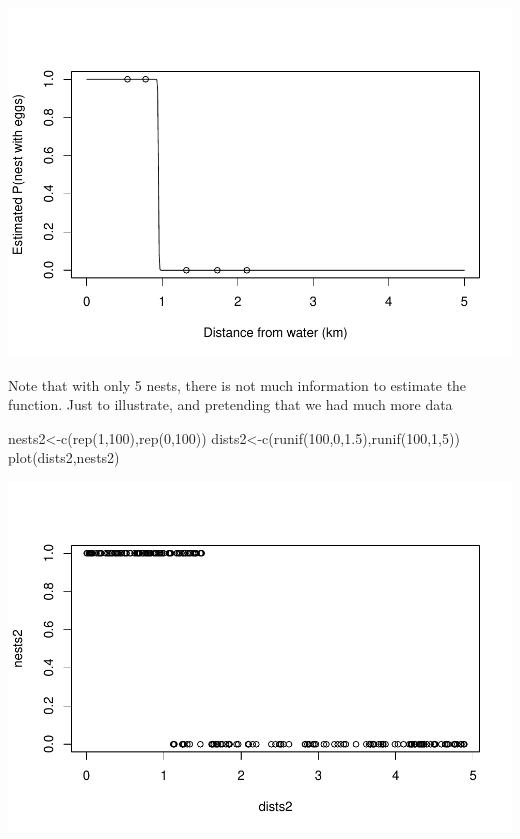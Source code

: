 \documentclass[
]{book}
\newenvironment{Shaded}{\begin{snugshade}}{\end{snugshade}}
\newcommand{\DecValTok}[1]{\textcolor[rgb]{0.00,0.00,0.81}{#1}}
\newcommand{\FloatTok}[1]{\textcolor[rgb]{0.00,0.00,0.81}{#1}}
\newcommand{\FunctionTok}[1]{\textcolor[rgb]{0.00,0.00,0.00}{#1}}
\newcommand{\NormalTok}[1]{#1}
\newcommand{\OtherTok}[1]{\textcolor[rgb]{0.56,0.35,0.01}{#1}}
\begin{document}
\includegraphics{ECOMODbook_files/figure-latex/ch13.36-1.pdf}

Note that with only 5 nests, there is not much information to estimate the function. Just to illustrate, and pretending that we had much more data

\begin{Shaded}
\begin{Highlighting}[]
\NormalTok{nests2}\OtherTok{\textless{}{-}}\FunctionTok{c}\NormalTok{(}\FunctionTok{rep}\NormalTok{(}\DecValTok{1}\NormalTok{,}\DecValTok{100}\NormalTok{),}\FunctionTok{rep}\NormalTok{(}\DecValTok{0}\NormalTok{,}\DecValTok{100}\NormalTok{))}
\NormalTok{dists2}\OtherTok{\textless{}{-}}\FunctionTok{c}\NormalTok{(}\FunctionTok{runif}\NormalTok{(}\DecValTok{100}\NormalTok{,}\DecValTok{0}\NormalTok{,}\FloatTok{1.5}\NormalTok{),}\FunctionTok{runif}\NormalTok{(}\DecValTok{100}\NormalTok{,}\DecValTok{1}\NormalTok{,}\DecValTok{5}\NormalTok{))}
\FunctionTok{plot}\NormalTok{(dists2,nests2)}
\end{Highlighting}
\end{Shaded}

\includegraphics{ECOMODbook_files/figure-latex/unnamed-chunk-3-1.pdf}
\end{document}
